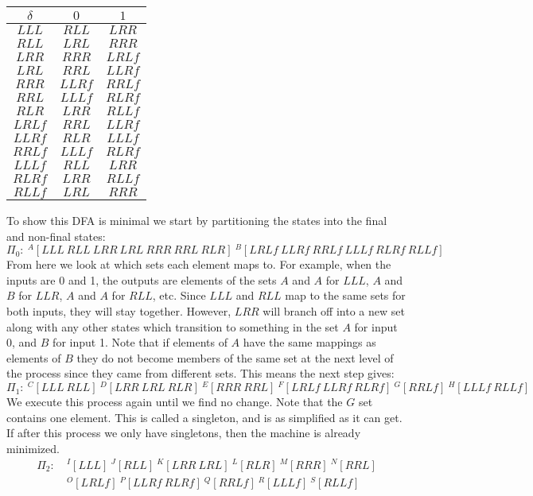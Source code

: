 \documentclass{scrartcl}
\begin{document}
\begin{center}
\begin{tabular} {|c|c c|}
\hline
$\delta$&$0$&$1$\\
\hline
$LLL$  & $RLL$  & $LRR$  \\
\hline
$RLL$  & $LRL$  & $RRR$  \\
\hline
$LRR$  & $RRR$  & $LRLf$ \\
\hline
$LRL$  & $RRL$  & $LLRf$ \\
\hline
$RRR$  & $LLRf$ & $RRLf$ \\
\hline
$RRL$  & $LLLf$ & $RLRf$ \\
\hline
$RLR$  & $LRR$  & $RLLf$ \\
\hline
$LRLf$ & $RRL$  & $LLRf$ \\
\hline
$LLRf$ & $RLR$  & $LLLf$ \\
\hline
$RRLf$ & $LLLf$ & $RLRf$ \\
\hline
$LLLf$ & $RLL$  & $LRR$  \\
\hline
$RLRf$ & $LRR$  & $RLLf$ \\
\hline
$RLLf$ & $LRL$  & $RRR$  \\
\hline
\end{tabular}
\end{center}
To show this DFA is minimal we start by partitioning the states into the final
and non-final states:
$$\Pi_0 :\ ^A[LLL\ RLL\ LRR\ LRL\ RRR\ RRL\ RLR]\
           ^B[LRLf\ LLRf\ RRLf\ LLLf\ RLRf\ RLLf]$$
From here we look at which sets each element maps to. For example, when the
inputs are 0 and 1, the outputs are elements of the sets $A$ and $A$ for $LLL$,
$A$ and $B$ for $LLR$, $A$ and $A$ for $RLL$, etc. Since $LLL$ and $RLL$ map to
the same sets for both inputs, they will stay together. However, $LRR$ will
branch off into a new set along with any other states which transition to
something in the set $A$ for input 0, and $B$ for input 1. Note that if elements
of $A$ have the same mappings as elements of $B$ they do not become members of
the same set at the next level of the process since they came from different
sets. This means the next step gives:
$$\Pi_1 :\ ^C[LLL\ RLL]\
           ^D[LRR\ LRL\ RLR]\
           ^E[RRR\ RRL]\
           ^F[LRLf\ LLRf\ RLRf]\
           ^G[RRLf]\
           ^H[LLLf\ RLLf]$$
We execute this process again until we find no change. Note that the $G$ set
contains one element. This is called a singleton, and is as simplified as it
can get. If after this process we only have singletons, then the machine is
already minimized.
\begin{align*}
\Pi_2 :\ &^I[LLL]\ 
           ^J[RLL]\
           ^K[LRR\ LRL]\ 
           ^L[RLR]\
           ^M[RRR]\
           ^N[RRL]\\
        &  ^O[LRLf]\
           ^P[LLRf\ RLRf]\
           ^Q[RRLf]\
           ^R[LLLf]\
           ^S[RLLf]
\end{align*}
\end{document}
